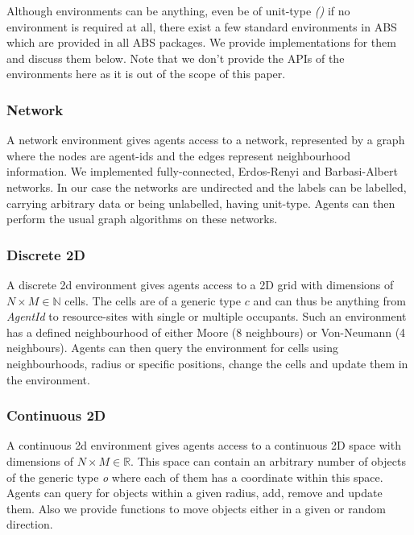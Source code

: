 Although environments can be anything, even be of unit-type \textit{()} if no environment is required at all, there exist a few standard environments in ABS which are provided in all ABS packages. We provide implementations for them and discuss them below. Note that we don't provide the APIs of the environments here as it is out of the scope of this paper.

\subsubsection{Network}
A network environment gives agents access to a network, represented by a graph where the nodes are agent-ids and the edges represent neighbourhood information. We implemented fully-connected, Erdos-Renyi and Barbasi-Albert networks. In our case the networks are undirected and the labels can be labelled, carrying arbitrary data or being unlabelled, having unit-type. Agents can then perform the usual graph algorithms on these networks. 

\subsubsection{Discrete 2D}
A discrete 2d environment gives agents access to a 2D grid with dimensions of $N \times M \in \mathbb{N}$ cells. The cells are of a generic type $c$ and can thus be anything from \textit{AgentId} to resource-sites with single or multiple occupants. Such an environment has a defined neighbourhood of either Moore (8 neighbours) or Von-Neumann (4 neighbours). Agents can then query the environment for cells using neighbourhoods, radius or specific positions, change the cells and update them in the environment.

\subsubsection{Continuous 2D}
A continuous 2d environment gives agents access to a continuous 2D space with dimensions of $N \times M \in \mathbb{R}$. This space can contain an arbitrary number of objects of the generic type \textit{o} where each of them has a coordinate within this space. Agents can query for objects within a given radius, add, remove and update them. Also we provide functions to move objects either in a given or random direction.

